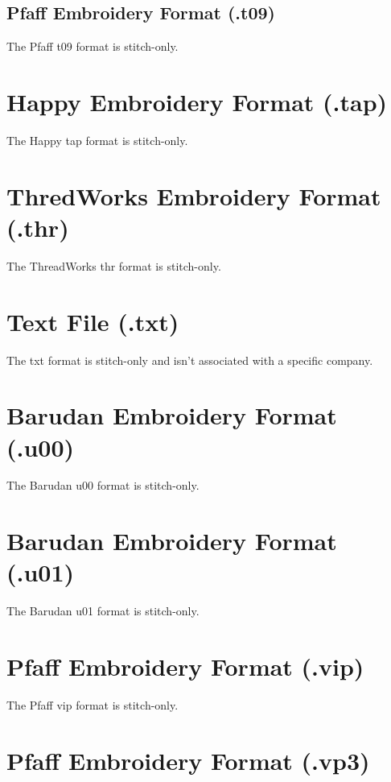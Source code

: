 \subsection{Pfaff Embroidery Format (.t09)}

The Pfaff t09 format is stitch-only.

\section{Happy Embroidery Format (.tap)}

The Happy tap format is stitch-only.

\section{ThredWorks Embroidery Format (.thr)}

The ThreadWorks thr format is stitch-only.

\section{Text File (.txt)}

The txt format is stitch-only and isn't associated with a specific company.

\section{Barudan Embroidery Format (.u00)}

The Barudan u00 format is stitch-only.

\section{Barudan Embroidery Format (.u01)}

The Barudan u01 format is stitch-only.

\section{Pfaff Embroidery Format (.vip)}

The Pfaff vip format is stitch-only.

\section{Pfaff Embroidery Format (.vp3)}

